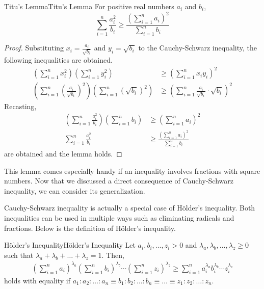\documentclass[../../../main.tex]{subfiles}
\begin{document}
\begin{corollary}{Titu's Lemma}{Titu's Lemma}
For positive real numbers $a_i$ and $b_i$,
\[
\sum_{i=1}^n \frac{a_i^2}{b_i}
\geq
\frac{ \left( \sum_{i=1}^n a_i \right)^2 }{ \sum_{i=1}^n b_i }
\]
\end{corollary}
\begin{proof}
Substituting $x_i = \frac{a_i}{\sqrt{b_i}}$ and $y_i = \sqrt{b_i}$
to the Cauchy-Schwarz inequality, the following inequalities are
obtained.
\begin{align*}
    \left( \sum_{i=1}^n x_i^2 \right)
    \left( \sum_{i=1}^n y_i^2 \right)
    &\geq
    \left( \sum_{i=1}^n x_i y_i \right)^2 \\[0.5em]
    \left(
        \sum_{i=1}^n \left( \frac{a_i}{\sqrt{b_i}} \right)^2
    \right)
    \left(
        \sum_{i=1}^n \left( \sqrt{b_i} \right)^2
    \right)
    &\geq
    \left(
        \sum_{i=1}^n \frac{a_i}{\sqrt{b_i}} \cdot \sqrt{b_i}
    \right)^2
\end{align*}
Recasting,
\begin{align*}
    \left( \sum_{i=1}^n \frac{a_i^2}{b_i} \right)
        \left( \sum_{i=1}^n b_i \right)
    &\geq
    \left( \sum_{i=1}^n a_i \right)^2 \\
    \sum_{i=1}^n \frac{a_i^2}{b_i}
    &\geq
    \frac{ \left( \sum_{i=1}^n a_i \right)^2 }{ \sum_{i=1}^n b_i }
\end{align*}
are obtained and the lemma holds.
\end{proof}

This lemma comes especially handy if an inequality involves
fractions with square numbers. Now that we discussed a direct
consequence of Cauchy-Schwarz inequality, we can consider its
generalization.

Cauchy-Schwarz inequality is actually a special case of Hölder's
inequality. Both inequalities can be used in multiple ways such as
eliminating radicals and fractions. Below is the definition of
Hölder's inequality.

\begin{definition}{Hölder's Inequality}{Hölder's Inequality}
Let $a_i, b_i, \ldots, z_i > 0$ and $\lambda_a, \lambda_b, \ldots,
\lambda_z \geq 0$ such that $\lambda_a + \lambda_b + \dots +
\lambda_z = 1$. Then,
\vspace{-0.5\baselineskip}
\begin{align*}
\left( \sum_{i=1}^n a_i \right)^{\lambda_a}
\left( \sum_{i=1}^n b_i \right)^{\lambda_b} \cdots
\left( \sum_{i=1}^n z_i \right)^{\lambda_z}
\geq
    \sum_{i=1}^n a_i^{\lambda_a} b_i^{\lambda_b}
        \cdots z_i^{\lambda_z}
\end{align*}
holds with equality if $a_1 : a_2 : \dots : a_n \equiv b_1 : b_2 :
\dots : b_n \equiv \dots \equiv z_1 : z_2 : \dots : z_n$.
\end{definition}
\end{document}
